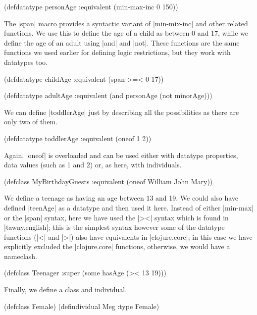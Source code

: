 \begin{tawny}
(defdatatype personAge
  :equivalent (min-max-inc 0 150))
\end{tawny}

The |span| macro provides a syntactic variant of |min-mix-inc| and other
related functions. We use this to define the age of a child as between
0 and 17, while we define the age of an adult using |and| and
|not|. These functions are the same functions we used earlier for
defining logic restrictions, but they work with datatypes too.

\begin{tawny}
(defdatatype childAge
  :equivalent (span >=< 0 17))

(defdatatype adultAge
  :equivalent (and personAge (not minorAge)))
\end{tawny}

We can define |toddlerAge| just by describing all the possibilities as
there are only two of them.

\begin{tawny}
(defdatatype toddlerAge
  :equivalent (oneof 1 2))
\end{tawny}

Again, |oneof| is overloaded and can be used either with datatype
properties, data values (such as 1 and 2) or, as here, with
individuals.

\begin{tawny}
(defclass MyBirthdayGuests
  :equivalent (oneof William John Mary))
\end{tawny}

We define a teenage as having an age between 13 and 19. We could also have
defined |teenAge| as a datatype and then used it here. Instead of either
|min-max| or the |span| syntax, here we have used the |><| syntax which is
found in |tawny.english|; this is the simplest syntax however some
of the datatype functions (|<| and |>|) also have equivalents in
|clojure.core|; in this case we have explicitly excluded the
|clojure.core| functions, otherwise, we would have a nameclash.

\begin{tawny}
(defclass Teenager
  :super (some hasAge (>< 13 19)))
\end{tawny}

Finally, we define a class and individual.

\begin{tawny}
(defclass Female)
(defindividual Meg :type Female)
\end{tawny}

